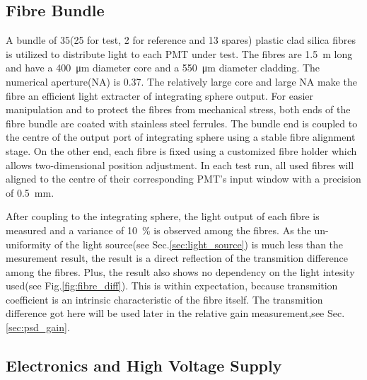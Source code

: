 \documentclass[5p, times]{elsarticle}
\begin{document}
\subsection{Fibre Bundle}
\label{sec:fibre_bundle}

A bundle of 35(25 for test, 2 for reference and 13 spares) plastic clad silica fibres is utilized to distribute light to each PMT under test.
The fibres are \SI{1.5}{\meter} long and have a \SI{400}{\micro\meter} diameter core and a \SI{550}{\micro\meter} diameter cladding.
The numerical aperture(NA) is 0.37.
The relatively large core and large NA make the fibre an efficient light extracter of integrating sphere output. 
For easier manipulation and to protect the fibres from mechanical stress, both ends of the fibre bundle are coated with stainless steel ferrules.
The bundle end is coupled to the centre of the output port of integrating sphere using a stable fibre alignment stage.
On the other end, each fibre is fixed using a customized fibre holder which allows two-dimensional position adjustment.
In each test run, all used fibres will aligned to the centre of their corresponding PMT's input window with a precision of \SI{0.5}{\milli\meter}.  

After coupling to the integrating sphere, the light output of each fibre is measured and a variance of \SI{10}{\percent} is observed among the fibres. 
As the un-uniformity of the light source(see Sec.\ref{sec:light_source}) is much less than the mesurement result, the result is a direct reflection of the transmition difference among the fibres.
Plus, the result also shows no dependency on the light intesity used(see Fig.\ref{fig:fibre_diff}). 
This is within expectation, because transmition coefficient is an intrinsic characteristic of the fibre itself.
The transmition difference got here will be used later in the relative gain measurement,see Sec.\ref{sec:psd_gain}.


\subsection{Electronics and High Voltage Supply}
\label{sec:electronics}
\end{document}
